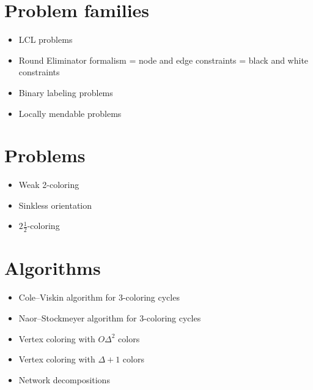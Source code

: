 \documentclass[a4paper,11pt]{article}
\begin{document}
\section{Problem families}
\begin{itemize}
    \item LCL problems \cite{naor-stockmeyer-1995-what-can-be-computed-locally}
    \item Round Eliminator formalism = node and edge constraints = black and white constraints \cite{olivetti-2020-brief-announcement-round-eliminator-a,olivetti-2025-round-eliminator-a-tool-for-automatic}
    \item Binary labeling problems \cite{balliu-brandt-etal-2020-classification-of-distributed}
    \item Locally mendable problems \cite{balliu-hirvonen-etal-2022-local-mending}
\end{itemize}

\section{Problems}
\begin{itemize}
    \item Weak 2-coloring \cite{naor-stockmeyer-1995-what-can-be-computed-locally}
    \item Sinkless orientation \cite{brandt-fischer-etal-2016-a-lower-bound-for-the}
    \item $2\frac{1}{2}$-coloring \cite{chang-pettie-2019-a-time-hierarchy-theorem-for-the}
\end{itemize}

\section{Algorithms}
\begin{itemize}
    \item Cole--Viskin algorithm for 3-coloring cycles \cite{cole-vishkin-1986-deterministic-coin-tossing-with,goldberg-plotkin-shannon-1988-parallel-symmetry}
    \item Naor--Stockmeyer algorithm for 3-coloring cycles \cite{naor-stockmeyer-1995-what-can-be-computed-locally}
    \item Vertex coloring with $O\Delta^2$ colors \cite{linial-1992-locality-in-distributed-graph-algorithms}
    \item Vertex coloring with $\Delta+1$ colors \cite{maus-tonoyan-2022-linial-for-lists,barenboim-elkin-goldenberg-2022-locally-iterative}
    \item Network decompositions \cite{awerbuch-goldberg-etal-1989-network-decomposition-and,rozhon-ghaffari-2020-polylogarithmic-time-deterministic}
\end{itemize}
\end{document}
